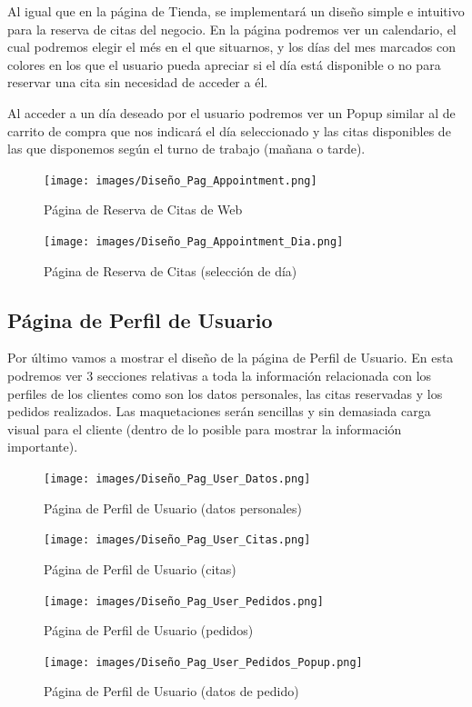 Al igual que en la página de Tienda, se implementará un diseño simple e intuitivo para la reserva de citas del negocio.
En la página podremos ver un calendario, el cual podremos elegir el més en el que situarnos, y los días del mes marcados con colores en los que el usuario pueda apreciar si el día está disponible o no para reservar una cita sin necesidad de acceder a él.

Al acceder a un día deseado por el usuario podremos ver un Popup similar al de carrito de compra que nos indicará el día seleccionado y las citas disponibles de las que disponemos según el turno de trabajo (mañana o tarde).

\begin{figure}[H]
  \centering
  \texttt{[image: images/Diseño\_Pag\_Appointment.png]}
  \caption{Página de Reserva de Citas de Web}
  \label{}
\end{figure}

\begin{figure}[H]
  \centering
  \texttt{[image: images/Diseño\_Pag\_Appointment\_Dia.png]}
  \caption{Página de Reserva de Citas (selección de día)}
  \label{}
\end{figure}

\subsection{Página de Perfil de Usuario}

Por último vamos a mostrar el diseño de la página de Perfil de Usuario. En esta podremos ver 3 secciones relativas a toda la información relacionada con los perfiles de los clientes como son los datos personales, las citas reservadas y los pedidos realizados. Las maquetaciones serán sencillas y sin demasiada carga visual para el cliente (dentro de lo posible para mostrar la información importante).

\begin{figure}[H]
  \centering
  \texttt{[image: images/Diseño\_Pag\_User\_Datos.png]}
  \caption{Página de Perfil de Usuario (datos personales)}
  \label{}
\end{figure}

\begin{figure}[H]
  \centering
  \texttt{[image: images/Diseño\_Pag\_User\_Citas.png]}
  \caption{Página de Perfil de Usuario (citas)}
  \label{}
\end{figure}

\begin{figure}[H]
  \centering
  \texttt{[image: images/Diseño\_Pag\_User\_Pedidos.png]}
  \caption{Página de Perfil de Usuario (pedidos)}
  \label{}
\end{figure}

\begin{figure}[H]
  \centering
  \texttt{[image: images/Diseño\_Pag\_User\_Pedidos\_Popup.png]}
  \caption{Página de Perfil de Usuario (datos de pedido)}
  \label{}
\end{figure}